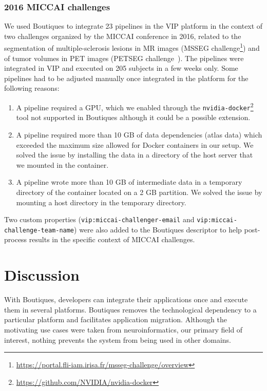 \documentclass[a4paper,num-refs]{oup-contemporary}
\newcommand{\boutiques}{Boutiques\xspace}
\begin{document}
\subsubsection{2016 MICCAI challenges}

We used \boutiques to integrate 23 pipelines in the VIP platform in
the context of two challenges organized by the MICCAI conference in
2016, related to the segmentation of multiple-sclerosis lesions in MR
images (MSSEG
challenge\footnote{\url{https://portal.fli-iam.irisa.fr/msseg-challenge/overview}})
and of tumor volumes in PET images (PETSEG
challenge~\cite{hatt2018}). The
pipelines were integrated in VIP and executed on 205 subjects in a few
weeks only. Some pipelines had to be adjusted manually once integrated in
the platform for the following reasons:
\begin{enumerate}
\item A pipeline
  required a GPU, which we enabled through the
  \texttt{nvidia-docker}\footnote{\url{https://github.com/NVIDIA/nvidia-docker}}
  tool not supported in Boutiques although it could be a possible extension.
\item A pipeline required more than 10 GB of data dependencies (atlas
  data) which exceeded the maximum size allowed for Docker containers
  in our setup. We solved the issue by installing the data in a
  directory of the host server that we mounted in the container.
\item A pipeline wrote more than 10 GB of intermediate data in a
  temporary directory of the container located on a 2 GB partition. We
  solved the issue by mounting a host directory in the temporary directory. 
\end{enumerate}
Two custom properties (\texttt{vip:miccai-challenger-email}
and \texttt{vip:miccai-challenge-team-name}) were also added to the
\boutiques descriptor to help post-process results in the specific
context of MICCAI challenges.


\section{Discussion}
With \boutiques, developers can integrate their applications once and
execute them in several platforms. \boutiques removes the
technological dependency to a particular platform and facilitates
application migration.  Although the motivating use cases were taken
from neuroinformatics, our primary field of interest, nothing prevents
the system from being used in other domains.
\end{document}
